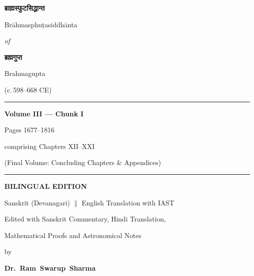 \documentclass[11pt,a4paper]{article}
\newcommand{\shortline}{\noindent\rule{0.5\textwidth}{0.4pt}\par}
\newcommand{\devbf}[1]{{\devanagarifont\bfseries #1}}
\begin{document}
\begin{titlepage}
\centering
\vspace*{1.5cm}

{\color{titlecolor}\Huge\devbf{ब्राह्मस्फुटसिद्धान्त}\par}
\vspace{0.4cm}
{\color{sectioncolor}\LARGE Br\=ahmasphu\d tasiddh\=anta\par}
\vspace{1.2cm}

{\Large\textit{of}\par}
\vspace{0.4cm}
{\color{titlecolor}\LARGE\devbf{ब्रह्मगुप्त}\par}
\vspace{0.3cm}
{\Large Brahmagupta\par}
\vspace{0.3cm}
{\large (c.\,598--668 CE)\par}

\vspace{1.5cm}
\shortline
\vspace{0.8cm}

{\Large\bfseries Volume III --- Chunk I\par}
\vspace{0.4cm}
{\large Pages 1677--1816\par}
\vspace{0.3cm}
{\normalsize comprising Chapters XII--XXI\par}
\vspace{0.4cm}
{\large (Final Volume: Concluding Chapters \& Appendices)\par}

\vspace{1.2cm}
\shortline
\vspace{0.8cm}

{\normalsize\textbf{BILINGUAL EDITION}\par}
\vspace{0.3cm}
{\small Sanskrit (Devanagari) $\parallel$ English Translation with IAST\par}

\vspace{1cm}
{\normalsize Edited with Sanskrit Commentary, Hindi Translation,\par}
\vspace{0.2cm}
{\normalsize Mathematical Proofs and Astronomical Notes\par}
\vspace{0.4cm}
{\large by\par}
\vspace{0.3cm}
{\large\bfseries Dr.~Ram~Swarup~Sharma\par}


\end{titlepage}
\end{document}
